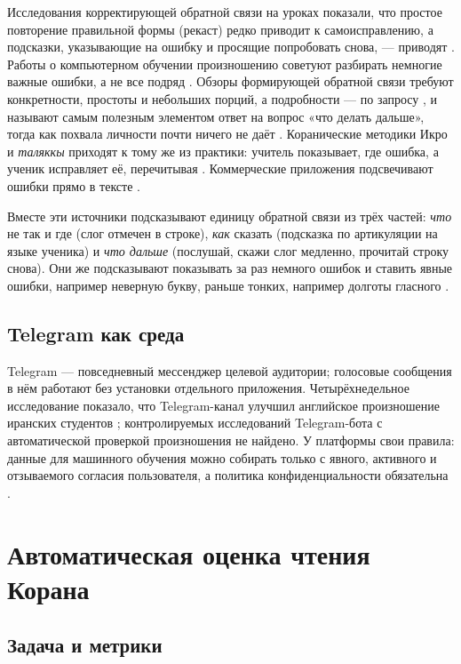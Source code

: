 \documentclass[a4paper,14pt]{extarticle}
\begin{document}
Исследования корректирующей обратной связи на уроках показали, что простое повторение правильной формы
(рекаст) редко приводит к самоисправлению, а подсказки, указывающие на ошибку и просящие попробовать
снова, --- приводят \cite{SRC-053}. Работы о компьютерном обучении произношению советуют разбирать
немногие важные ошибки, а не все подряд \cite{SRC-054}. Обзоры формирующей обратной связи требуют
конкретности, простоты и небольших порций, а подробности --- по запросу \cite{SRC-055}, и называют
самым полезным элементом ответ на вопрос «что делать дальше», тогда как похвала личности почти ничего не
даёт \cite{SRC-056}. Коранические методики Икро и \emph{таляккы} приходят к тому же из практики:
учитель показывает, где ошибка, а ученик исправляет её, перечитывая \cite{SRC-057,SRC-058}.
Коммерческие приложения подсвечивают ошибки прямо в тексте \cite{SRC-046}.

Вместе эти источники подсказывают единицу обратной связи из трёх частей: \emph{что} не так и где (слог
отмечен в строке), \emph{как} сказать (подсказка по артикуляции на языке ученика) и \emph{что дальше}
(послушай, скажи слог медленно, прочитай строку снова). Они же подсказывают показывать за раз
немного ошибок и ставить явные ошибки, например неверную букву, раньше тонких, например долготы
гласного \cite{SRC-052}.

\subsection{Telegram как среда}

Telegram --- повседневный мессенджер целевой аудитории; голосовые сообщения в нём работают без
установки отдельного приложения. Четырёхнедельное исследование показало, что Telegram-канал улучшил
английское произношение иранских студентов \cite{SRC-092}; контролируемых исследований Telegram-бота с
автоматической проверкой произношения не найдено. У платформы свои правила: данные для машинного
обучения можно собирать только с явного, активного и отзываемого согласия пользователя, а политика
конфиденциальности обязательна \cite{SRC-033}.

\section{Автоматическая оценка чтения Корана}

\subsection{Задача и метрики}
\end{document}
